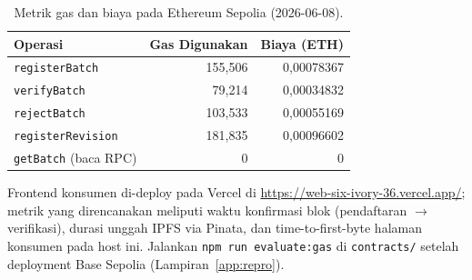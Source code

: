 \begin{table}[t]
  \caption{Metrik gas dan biaya pada Ethereum Sepolia (2026-06-08).}
  \label{tab:gas}
  \centering
  \footnotesize
  \begin{tabularx}{\columnwidth}{@{}Xrr@{}}
    \toprule
    \textbf{Operasi} & \textbf{Gas Digunakan} & \textbf{Biaya (ETH)} \\
    \midrule
    \texttt{registerBatch} & 155,506 & 0,00078367 \\
    \texttt{verifyBatch} & 79,214 & 0,00034832 \\
    \texttt{rejectBatch} & 103,533 & 0,00055169 \\
    \texttt{registerRevision} & 181,835 & 0,00096602 \\
    \texttt{getBatch} (baca RPC) & 0 & 0 \\
    \bottomrule
  \end{tabularx}
\end{table}

Frontend konsumen di-deploy pada Vercel di \url{https://web-six-ivory-36.vercel.app/}; metrik yang direncanakan meliputi waktu konfirmasi blok (pendaftaran $\rightarrow$ verifikasi), durasi unggah IPFS via Pinata, dan time-to-first-byte halaman konsumen pada host ini.
Jalankan \texttt{npm run evaluate:gas} di \texttt{contracts/} setelah deployment Base Sepolia (Lampiran~\ref{app:repro}).
